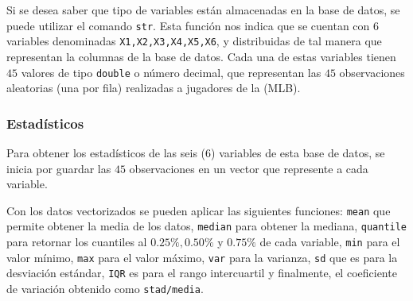\documentclass{staprojteamusb}
\begin{document}
 Si se desea saber que tipo de variables están almacenadas en la base de datos, se puede utilizar el comando \texttt{str}. Esta función nos indica que se cuentan con \(6\) variables denominadas \texttt{X1,X2,X3,X4,X5,X6}, y distribuidas de tal manera que representan la columnas de la base de datos. Cada una de estas variables tienen \(45\) valores de tipo \texttt{double} o número decimal, que representan las \(45\) observaciones aleatorias (una por fila) realizadas a jugadores de la (MLB).

 \hypertarget{estaduxedsticos}{%
 \subsubsection{Estadísticos}\label{estaduxedsticos}}

 Para obtener los estadísticos de las seis (6) variables de esta base de datos, se inicia por guardar las \(45\) observaciones en un vector que represente a cada variable.

 Con los datos vectorizados se pueden aplicar las siguientes funciones: \texttt{mean} que permite obtener la media de los datos, \texttt{median} para obtener la mediana, \texttt{quantile} para retornar los cuantiles al \(0.25\%, 0.50\%\) y \(0.75\%\) de cada variable, \texttt{min} para el valor mínimo, \texttt{max} para el valor máximo, \texttt{var} para la varianza, \texttt{sd} que es para la desviación estándar, \texttt{IQR} es para el rango intercuartil y finalmente, el coeficiente de variación obtenido como \texttt{stad/media}.

 \begin{table}[h]
 \centering
 \caption{\label{tab:resumen}Resumen Estadístico de las variables}
 \end{table}
\end{document}
